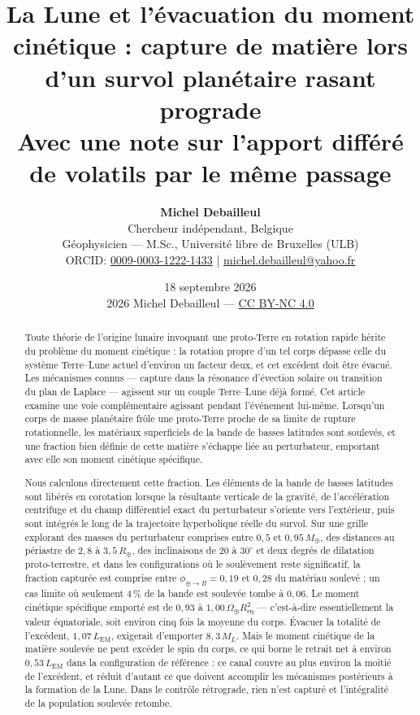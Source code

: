 \documentclass[11pt,a4paper]{article}
\title{\textbf{\Large La Lune et l'évacuation du moment cinétique : capture de matière lors d'un survol planétaire rasant prograde}\\
\large Avec une note sur l'apport différé de volatils par le même passage}
\author{\textbf{Michel Debailleul}\\
\small Chercheur indépendant, Belgique\\
\small Géophysicien --- M.Sc., Université libre de Bruxelles (ULB)\\
\small ORCID: \href{https://orcid.org/0009-0003-1222-1433}{0009-0003-1222-1433} \quad | \quad \href{mailto:michel.debailleul@yahoo.fr}{michel.debailleul@yahoo.fr}
}
\date{18 septembre 2026\\[4pt]\footnotesize\textcopyright{} 2026 Michel Debailleul --- \href{https://creativecommons.org/licenses/by-nc/4.0/}{CC BY-NC 4.0}}
\begin{document}
\maketitle

\begin{abstract}
Toute théorie de l'origine lunaire invoquant une proto-Terre en rotation rapide hérite du problème du moment cinétique : la rotation propre d'un tel corps dépasse celle du système Terre--Lune actuel d'environ un facteur deux, et cet excédent doit être évacué. Les mécanismes connus --- capture dans la résonance d'évection solaire ou transition du plan de Laplace --- agissent sur un couple Terre--Lune déjà formé. Cet article examine une voie complémentaire agissant pendant l'événement lui-même. Lorsqu'un corps de masse planétaire frôle une proto-Terre proche de sa limite de rupture rotationnelle, les matériaux superficiels de la bande de basses latitudes sont soulevés, et une fraction bien définie de cette matière s'échappe liée au perturbateur, emportant avec elle son moment cinétique spécifique.

Nous calculons directement cette fraction. Les éléments de la bande de basses latitudes sont libérés en corotation lorsque la résultante verticale de la gravité, de l'accélération centrifuge et du champ différentiel exact du perturbateur s'oriente vers l'extérieur, puis sont intégrés le long de la trajectoire hyperbolique réelle du survol. Sur une grille explorant des masses du perturbateur comprises entre $0{,}5$ et $0{,}95\,M_\oplus$, des distances au périastre de $2{,}8$ à $3{,}5\,R_\oplus$, des inclinaisons de $20$ à $30^\circ$ et deux degrés de dilatation proto-terrestre, et dans les configurations où le soulèvement reste significatif, la fraction capturée est comprise entre $\phi_{\oplus\to B} = 0{,}19$ et $0{,}28$ du matériau soulevé ; un cas limite où seulement $4\,\%$ de la bande est soulevée tombe à $0{,}06$. Le moment cinétique spécifique emporté est de $0{,}93$ à $1{,}00\,\Omega_\oplus R_{\mathrm{eq}}^2$ --- c'est-à-dire essentiellement la valeur équatoriale, soit environ cinq fois la moyenne du corps. Évacuer la totalité de l'excédent, $1{,}07\,L_{\mathrm{EM}}$, exigerait d'emporter $8{,}3\,M_L$. Mais le moment cinétique de la matière soulevée ne peut excéder le spin du corps, ce qui borne le retrait net à environ $0{,}53\,L_{\mathrm{EM}}$ dans la configuration de référence : ce canal couvre au plus environ la moitié de l'excédent, et réduit d'autant ce que doivent accomplir les mécanismes postérieurs à la formation de la Lune. Dans le contrôle rétrograde, rien n'est capturé et l'intégralité de la population soulevée retombe.


\end{abstract}
\end{document}
